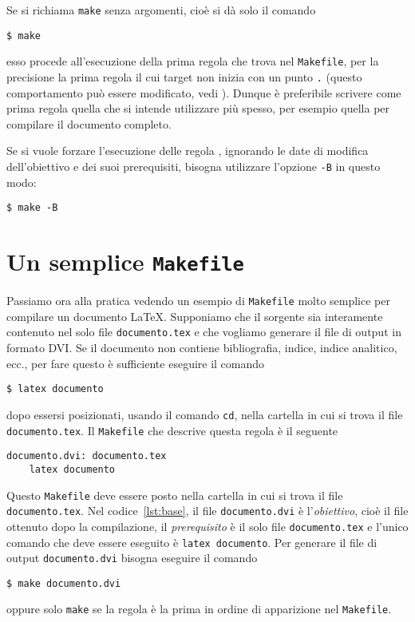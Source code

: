 Se si richiama \texttt{make} senza argomenti, cioè si dà solo il comando
\begin{verbatim}
$ make
\end{verbatim}
esso procede all'esecuzione della prima regola che trova nel \texttt{Makefile},
per la precisione la prima regola il cui target non inizia con un punto
\texttt{.}  (questo comportamento può essere modificato, vedi
\cite[pagina 5]{gnu:make}).  Dunque è preferibile scrivere come prima regola
quella che si intende utilizzare più spesso, per esempio quella per compilare il
documento completo.

Se si vuole forzare l'esecuzione delle regola , ignorando le
date di modifica dell'obiettivo e dei suoi prerequisiti, bisogna utilizzare
l'opzione \texttt{-B} in questo modo:
\begin{sintassi}
  \small \texttt{\$ make -B} 
\end{sintassi}

\section{Un semplice \texttt{Makefile}}
\label{sec:makefile-semplice}

Passiamo ora alla pratica vedendo un esempio di \texttt{Makefile} molto semplice
per compilare un documento \LaTeX{}.
Supponiamo che il sorgente sia interamente contenuto nel solo file
\texttt{documento.tex} e che vogliamo generare il file di output in formato DVI.
Se il documento non contiene bibliografia, indice, indice analitico, ecc., per
fare questo è sufficiente eseguire il comando
\begin{verbatim}
$ latex documento
\end{verbatim}
dopo essersi posizionati, usando il comando \texttt{cd}, nella cartella in cui
si trova il file \texttt{documento.tex}.  Il \texttt{Makefile} che descrive
questa regola è il seguente
\begin{lstlisting}[caption={Un semplice \texttt{Makefile}.},label=lst:base]
documento.dvi: documento.tex
	latex documento
\end{lstlisting}
Questo \texttt{Makefile} deve essere posto nella cartella in cui si trova il
file \texttt{documento.tex}.  Nel codice~\ref{lst:base}, il file
\texttt{documento.dvi} è l'\emph{obiettivo}, cioè il file ottenuto dopo la
compilazione, il \emph{prerequisito} è il solo file \texttt{documento.tex} e
l'unico comando che deve essere eseguito è \texttt{latex documento}.  Per
generare il file di output \texttt{documento.dvi} bisogna eseguire il comando
\begin{verbatim}
$ make documento.dvi
\end{verbatim}
oppure solo \texttt{make} se la regola è la prima in ordine di apparizione nel
\texttt{Makefile}.

